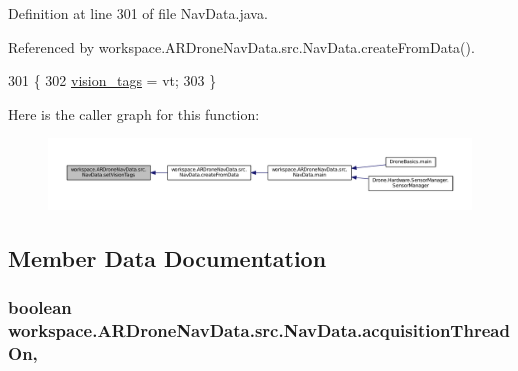 Definition at line 301 of file Nav\+Data.\+java.



Referenced by workspace.\+A\+R\+Drone\+Nav\+Data.\+src.\+Nav\+Data.\+create\+From\+Data().


\begin{DoxyCode}
301                                                          \{
302         \hyperlink{classworkspace_1_1_a_r_drone_nav_data_1_1src_1_1_nav_data_a6804548938250814a3e86f3f1a7d035a}{vision\_tags} = vt;
303     \}
\end{DoxyCode}


Here is the caller graph for this function\+:\nopagebreak
\begin{figure}[H]
\begin{center}
\leavevmode
\includegraphics[width=350pt]{classworkspace_1_1_a_r_drone_nav_data_1_1src_1_1_nav_data_a636d7e555be5221385f60d6d9635363e_icgraph}
\end{center}
\end{figure}




\subsection{Member Data Documentation}
\hypertarget{classworkspace_1_1_a_r_drone_nav_data_1_1src_1_1_nav_data_ab876d9078e747060a12ec7ef9c810e81}{}
\subsubsection[{acquisition\+Thread\+On}]{\setlength{\rightskip}{0pt plus 5cm}boolean workspace.\+A\+R\+Drone\+Nav\+Data.\+src.\+Nav\+Data.\+acquisition\+Thread\+On\hspace{0.3cm}{\ttfamily [static]}, {\ttfamily [protected]}}\label{classworkspace_1_1_a_r_drone_nav_data_1_1src_1_1_nav_data_ab876d9078e747060a12ec7ef9c810e81}


